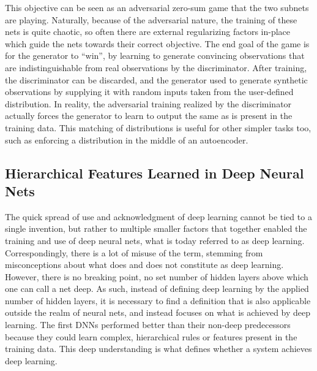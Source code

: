 			This objective can be seen as an adversarial zero-sum game that the two subnets are playing.
			Naturally, because of the adversarial nature, the training of these nets is quite chaotic, so often there are external regularizing factors in-place which guide the nets towards their correct objective.
			The end goal of the game is for the generator to ``win'', by learning to generate convincing observations that are indistinguishable from real observations by the discriminator.
			After training, the discriminator can be discarded, and the generator used to generate synthetic observations by supplying it with random inputs taken from the user-defined distribution.		
			In reality, the adversarial training realized by the discriminator actually forces the generator to learn to output the same  as is present in the training data.
			This matching of distributions is useful for other simpler tasks too, such as enforcing a distribution in the middle of an autoencoder.
			
		\subsection{Hierarchical Features Learned in Deep Neural Nets}
			\label{cha:deep_learning:sec:hierarchical_features}
			
			The quick spread of use and acknowledgment of deep learning cannot be tied to a single invention, but rather to multiple smaller factors that together enabled the training and use of deep neural nets, what is today referred to as deep learning.
			Correspondingly, there is a lot of misuse of the term, stemming from misconceptions about what does and does not constitute as deep learning.
			However, there is no breaking point, no set number of hidden layers above which one can call a net deep.
			As such, instead of defining deep learning by the applied number of hidden layers, it is necessary to find a definition that is also applicable outside the realm of neural nets, and instead focuses on what is achieved by deep learning.
			The first \acp{DNN} performed better than their non-deep predecessors because they could learn complex, hierarchical rules or features present in the training data.
			This deep understanding is what defines whether a system achieves deep learning.
			
